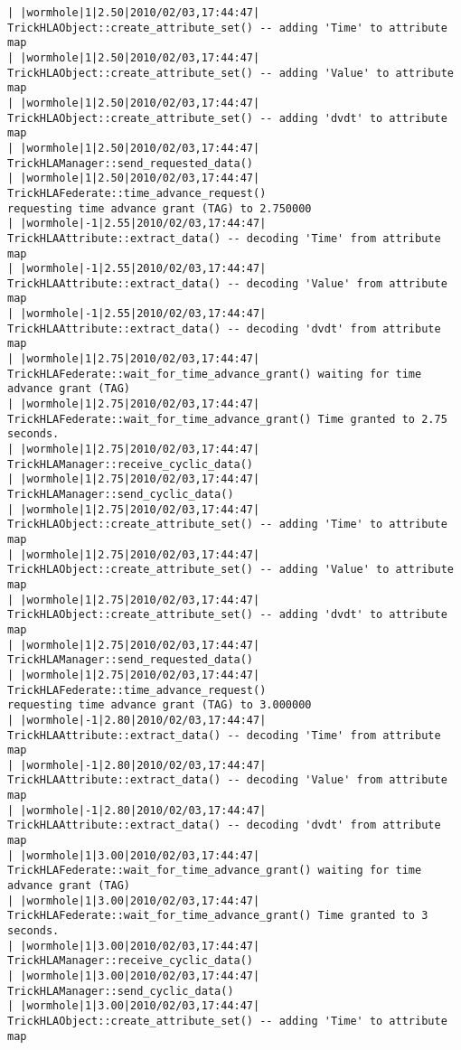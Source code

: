 \begin{lstlisting}[numbers=none,caption={output showing conditionally sent cyclic data}]
| |wormhole|1|2.50|2010/02/03,17:44:47| TrickHLAObject::create_attribute_set() -- adding 'Time' to attribute map
| |wormhole|1|2.50|2010/02/03,17:44:47| TrickHLAObject::create_attribute_set() -- adding 'Value' to attribute map
| |wormhole|1|2.50|2010/02/03,17:44:47| TrickHLAObject::create_attribute_set() -- adding 'dvdt' to attribute map
| |wormhole|1|2.50|2010/02/03,17:44:47| TrickHLAManager::send_requested_data()
| |wormhole|1|2.50|2010/02/03,17:44:47| TrickHLAFederate::time_advance_request()   
requesting time advance grant (TAG) to 2.750000
| |wormhole|-1|2.55|2010/02/03,17:44:47| TrickHLAAttribute::extract_data() -- decoding 'Time' from attribute map
| |wormhole|-1|2.55|2010/02/03,17:44:47| TrickHLAAttribute::extract_data() -- decoding 'Value' from attribute map
| |wormhole|-1|2.55|2010/02/03,17:44:47| TrickHLAAttribute::extract_data() -- decoding 'dvdt' from attribute map
| |wormhole|1|2.75|2010/02/03,17:44:47| TrickHLAFederate::wait_for_time_advance_grant() waiting for time advance grant (TAG)
| |wormhole|1|2.75|2010/02/03,17:44:47| TrickHLAFederate::wait_for_time_advance_grant() Time granted to 2.75 seconds.
| |wormhole|1|2.75|2010/02/03,17:44:47| TrickHLAManager::receive_cyclic_data()
| |wormhole|1|2.75|2010/02/03,17:44:47| TrickHLAManager::send_cyclic_data()
| |wormhole|1|2.75|2010/02/03,17:44:47| TrickHLAObject::create_attribute_set() -- adding 'Time' to attribute map
| |wormhole|1|2.75|2010/02/03,17:44:47| TrickHLAObject::create_attribute_set() -- adding 'Value' to attribute map
| |wormhole|1|2.75|2010/02/03,17:44:47| TrickHLAObject::create_attribute_set() -- adding 'dvdt' to attribute map
| |wormhole|1|2.75|2010/02/03,17:44:47| TrickHLAManager::send_requested_data()
| |wormhole|1|2.75|2010/02/03,17:44:47| TrickHLAFederate::time_advance_request()   
requesting time advance grant (TAG) to 3.000000
| |wormhole|-1|2.80|2010/02/03,17:44:47| TrickHLAAttribute::extract_data() -- decoding 'Time' from attribute map
| |wormhole|-1|2.80|2010/02/03,17:44:47| TrickHLAAttribute::extract_data() -- decoding 'Value' from attribute map
| |wormhole|-1|2.80|2010/02/03,17:44:47| TrickHLAAttribute::extract_data() -- decoding 'dvdt' from attribute map
| |wormhole|1|3.00|2010/02/03,17:44:47| TrickHLAFederate::wait_for_time_advance_grant() waiting for time advance grant (TAG)
| |wormhole|1|3.00|2010/02/03,17:44:47| TrickHLAFederate::wait_for_time_advance_grant() Time granted to 3 seconds.
| |wormhole|1|3.00|2010/02/03,17:44:47| TrickHLAManager::receive_cyclic_data()
| |wormhole|1|3.00|2010/02/03,17:44:47| TrickHLAManager::send_cyclic_data()
| |wormhole|1|3.00|2010/02/03,17:44:47| TrickHLAObject::create_attribute_set() -- adding 'Time' to attribute map

\end{lstlisting}
